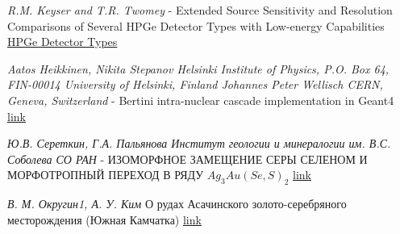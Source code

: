 \documentclass[a4paper, 14pt]{article}
\numberwithin{equation}{section}
\numberwithin{table}{section}
\begin{document}
\newpage	
\begin{thebibliography}{}
	
	 \textit{R.M. Keyser and T.R. Twomey} - Extended Source Sensitivity and Resolution Comparisons of Several HPGe Detector Types with Low-energy Capabilities \\
	\href{https://www.ortec-online.com/-/media/ametekortec/technical%20papers/high%20purity%20germanium%20detector%20applications%20and%20technology%20developements/extended-source-sensitivity-resolution-comparisons-several-hpge-detector-types-low-energy-capabilities.pdf?la=en}{ HPGe Detector Types}
		
	 \textit{Aatos Heikkinen, Nikita Stepanov Helsinki Institute of Physics, P.O. Box 64, FIN-00014 University of Helsinki, Finland Johannes Peter Wellisch CERN, Geneva, Switzerland} - Bertini intra-nuclear cascade implementation in Geant4
	\href{https://www.slac.stanford.edu/econf/C0303241/proc/papers/MOMT008.PDF}{link}
	
	 \textit{Ю.В. Сереткин, Г.А. Пальянова Институт геологии и минералогии им. В.С. Соболева СО РАН} - ИЗОМОРФНОЕ ЗАМЕЩЕНИЕ СЕРЫ СЕЛЕНОМ И МОРФОТРОПНЫЙ ПЕРЕХОД В РЯДУ $Ag_3Au(Se,S)_2$
	\href{https://www.sibran.ru/upload/iblock/478/478309021b63c0dc426e82c4025e6471.pdf}{link}
	
	 \textit{В. М. Округин1, А. У. Ким} О рудах Асачинского золото-серебряного месторождения
	(Южная Камчатка)
	\href{http://www.kscnet.ru/ivs/publication/volc_day/2014/art51.pdf}{link}
	
\end{thebibliography}
\end{document}
